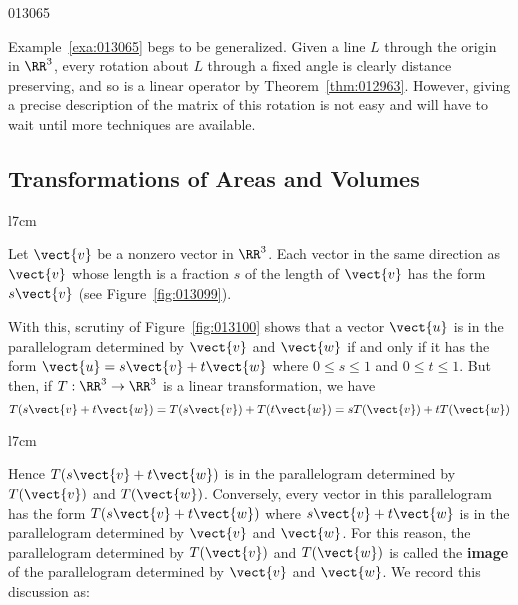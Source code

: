 \begin{example}{}{013065}
\begin{solution}
\end{solution}
\end{example}

Example~\ref{exa:013065} begs to be generalized. Given a line $L$ through the origin in $\RR^3$, every rotation about $L$ through a fixed angle is clearly distance preserving, and so is a linear operator by Theorem~\ref{thm:012963}.
 However, giving a precise description of the matrix of this rotation is
 not easy and will have to wait until more techniques are available.


\subsection*{Transformations of Areas and Volumes}

\begin{wrapfigure}{l}{7cm} 
\centering

\caption{\label{fig:013099}}
\end{wrapfigure}
Let $\vect{v}$ be a nonzero vector in $\RR^3$. Each vector in the same direction as $\vect{v}$ whose length is a fraction $s$ of the length of $\vect{v}$ has the form $s\vect{v}$ (see Figure~\ref{fig:013099}).

With this, scrutiny of Figure~\ref{fig:013100} shows that a vector $\vect{u}$ is in the parallelogram determined by $\vect{v}$ and $\vect{w}$ if and only if it has the form $\vect{u} = s\vect{v} + t\vect{w}$ where $0 \leq s \leq 1$ and $0 \leq t \leq 1$. But then, if $T : \RR^3 \to \RR^3$ is a linear transformation, we have
\begin{equation*}
T(s\vect{v} + t\vect{w}) = T(s\vect{v}) + T(t\vect{w}) = sT(\vect{v}) + tT(\vect{w})
\end{equation*}

\begin{wrapfigure}{l}{7cm} 
\vspace{-2em}
\centering

\caption{\label{fig:013100}}
\end{wrapfigure}
\noindent Hence $T(s\vect{v} + t\vect{w})$ is in the parallelogram determined by $T(\vect{v})$ and $T(\vect{w})$. Conversely, every vector in this parallelogram has the form $T(s\vect{v} + t\vect{w})$ where $s\vect{v} + t\vect{w}$ is in the parallelogram determined by $\vect{v}$ and $\vect{w}$. For this reason, the parallelogram determined by $T(\vect{v})$ and $T(\vect{w})$ is called the \textbf{image} of the parallelogram determined by $\vect{v}$ and $\vect{w}$. We record this discussion as:

